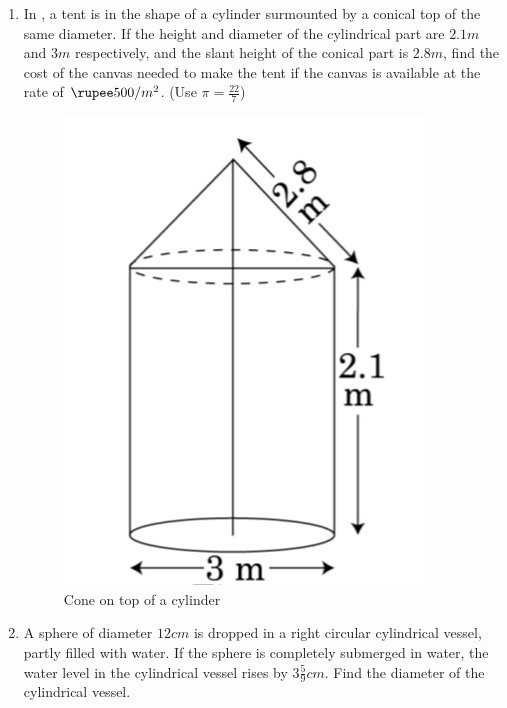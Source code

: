 \documentclass{article}
\begin{document}
\begin{enumerate}
    \item In , a tent is in the shape of a cylinder surmounted by a conical top of the same diameter. If the height and diameter of the cylindrical part are $2.1 m$ and $3 m$ respectively, and the slant height of the conical part is $2.8 m$, find the cost of the canvas needed to make the tent if the canvas is available at the rate of $\rupee 500/ m^2$. (Use $\pi = \frac{22}{7}$)
    \begin{figure}[H]
        \includegraphics[width=\columnwidth]{./coneontopofcylinder.jpg}
        \caption{Cone on top of a cylinder}
        \label{fig:coneontopofcylinder}
    \end{figure}

    \item A sphere of diameter $12 cm$ is dropped in a right circular cylindrical vessel, partly filled with water. If the sphere is completely submerged in water, the water level in the cylindrical vessel rises by $3\frac{5}{9} cm$. Find the diameter of the cylindrical vessel.


\end{enumerate}
\end{document}
